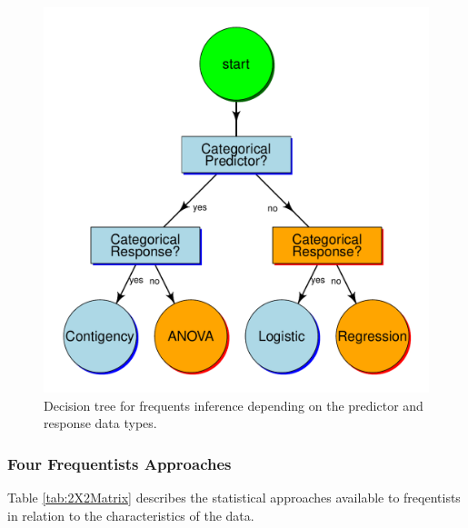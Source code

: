 \documentclass{article}\usepackage[]{graphicx}\usepackage[]{color}
\makeatletter
\def\maxwidth{ %
  \ifdim\Gin@nat@width>\linewidth
    \linewidth
  \else
    \Gin@nat@width
  \fi
}
\newenvironment{knitrout}{}{} %
\makeatother
\begin{document}
\begin{figure}
\caption{Decision tree for frequents inference depending on the predictor and response data types.}\label{fig:tree}
\begin{center}
\begin{knitrout}
\color{fgcolor}
\includegraphics[width=\maxwidth]{figure/unnamed-chunk-3-1} 

\end{knitrout}
\end{center}
\end{figure}


\subsubsection{Four Frequentists Approaches}

Table \ref{tab:2X2Matrix} describes the statistical approaches available to freqentists in relation to the characteristics of the data. 
\end{document}
